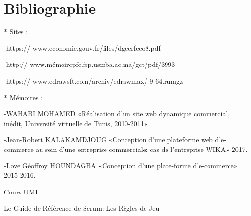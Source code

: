 \chapter{Bibliographie}


* Sites :

-https:// www.economie.gouv.fr/files/dgccrfeco8.pdf

-http:// www.mémoirepfe.fsp.usmba.ac.ma/get/pdf/3993

-https:// www.edrawsft.com/archiv/edrawmax/-9-64.rumgz

* Mémoires :

-WAHABI MOHAMED «Réalisation d'un site web dynamique commercial, inédit, Université virtuelle de Tunis, 2010-2011»

-Jean-Robert KALAKAMDJOUG «Conception d'une plateforme web d'e-commerce au sein d'une entreprise commerciale: cas de l'entreprise WIKA» 2017.

-Love Géoffroy HOUNDAGBA «Conception d'une plate-forme d'e-commerce» 2015-2016.

Cours UML

Le Guide de Référence de Scrum:
Les Règles de Jeu